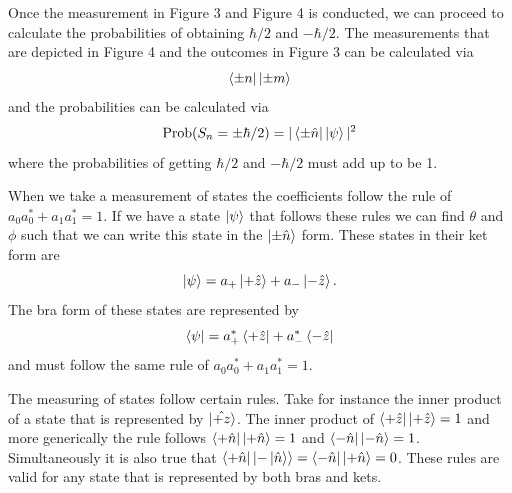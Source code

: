\documentclass[twocolumn]{article}
\begin{document}
\newline
Once the measurement in Figure 3 and Figure 4 is conducted, we can proceed to calculate the probabilities of obtaining $\hbar/2$ and $-\hbar/2$. The measurements that are depicted in Figure 4 and the outcomes in Figure 3 can be calculated via
\begin{equation} \label{eq:1}
\bra{\pm n}\ket{\pm m}
\end{equation}
and the probabilities can be calculated via
\begin{equation} \label{eq:2}
\text{Prob}(S_n=\pm \hbar/2)=|\bra{\pm\hat{n}}\ket{\psi}|^2
\end{equation}
where the probabilities of getting $\hbar/2$ and $-\hbar/2$ must add up to be 1. 

When we take a measurement of states the coefficients follow the rule of $a_0a_0^*+a_1a_1^*=1$. If we have a state $\ket{\psi}$ that follows these rules we can find $\theta$ and $\phi$ such that we can write this state in the $\ket{\pm\hat{n}}$ form. These states in their ket form are
\begin{equation} \label{eq:3}
\ket{\psi}=a_{+}\ket{+\hat{z}}+a_{-}\ket{-\hat{z}}.
\end{equation}
The bra form of these states are represented by
\begin{equation}\label{eq:4}
\bra{\psi}=a_{+}^*\bra{+\hat{z}}+a_{-}^*\bra{-\hat{z}}
\end{equation}
and must follow the same rule of $a_0a_0^*+a_1a_1^*=1$.

The measuring of states follow certain rules. Take for instance the inner product of a state that is represented by $\ket{\hat{+z}}$. The inner product of $\bra{+\hat{z}}\ket{+\hat{z}}=1$ and more generically the rule follows $\bra{+\hat{n}}\ket{+\hat{n}}=1$ and $\bra{-\hat{n}}\ket{-\hat{n}}=1$. Simultaneously it is also true that $\bra{+\hat{n}}\ket{-\ket{\hat{n}}}=\bra{-\hat{n}}\ket{+\hat{n}}=0$. These rules are valid for any state that is represented by both bras and kets.
\end{document}
